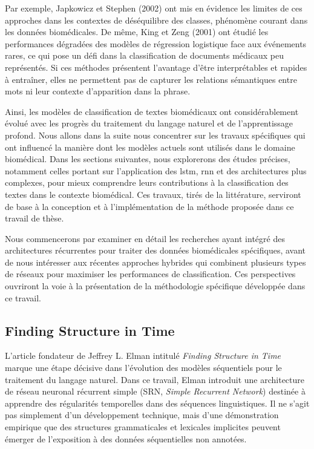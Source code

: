 \documentclass[12pt]{report}
\begin{document}
Par exemple, Japkowicz et Stephen (2002) \cite{japkowicz2002class} ont mis en évidence les limites de ces approches dans les contextes de déséquilibre des classes, phénomène courant dans les données biomédicales. De même, King et Zeng (2001) \cite{King2001Logit} ont étudié les performances dégradées des modèles de régression logistique face aux événements rares, ce qui pose un défi dans la classification de documents médicaux peu représentés. Si ces méthodes présentent l’avantage d’être interprétables et rapides à entraîner, elles ne permettent pas de capturer les relations sémantiques entre mots ni leur contexte d’apparition dans la phrase.

Ainsi, les modèles de classification de textes biomédicaux ont considérablement évolué avec les progrès du traitement du langage naturel et de l'apprentissage profond. Nous allons dans la suite nous concentrer sur les travaux spécifiques qui ont influencé la manière dont les modèles actuels sont utilisés dans le domaine biomédical. Dans les sections suivantes, nous explorerons des études précises, notamment celles portant sur l’application des \gls{lstm}, \gls{rnn} et des architectures plus complexes, pour mieux comprendre leurs contributions à la classification des textes dans le contexte biomédical. Ces travaux, tirés de la littérature, serviront de base à la conception et à l'implémentation de la méthode proposée dans ce travail de thèse.

Nous commencerons par examiner en détail les recherches ayant intégré des architectures récurrentes pour traiter des données biomédicales spécifiques, avant de nous intéresser aux récentes approches hybrides qui combinent plusieurs types de réseaux pour maximiser les performances de classification. Ces perspectives ouvriront la voie à la présentation de la méthodologie spécifique développée dans ce travail.

\subsection{Finding Structure in Time}

L’article fondateur de Jeffrey L. Elman intitulé \textit{Finding Structure in Time}~\cite{elman1990finding} marque une étape décisive dans l’évolution des modèles séquentiels pour le traitement du langage naturel. Dans ce travail, Elman introduit une architecture de réseau neuronal récurrent simple (SRN, \textit{Simple Recurrent Network}) destinée à apprendre des régularités temporelles dans des séquences linguistiques. Il ne s’agit pas simplement d’un développement technique, mais d’une démonstration empirique que des structures grammaticales et lexicales implicites peuvent émerger de l’exposition à des données séquentielles non annotées.
\end{document}
